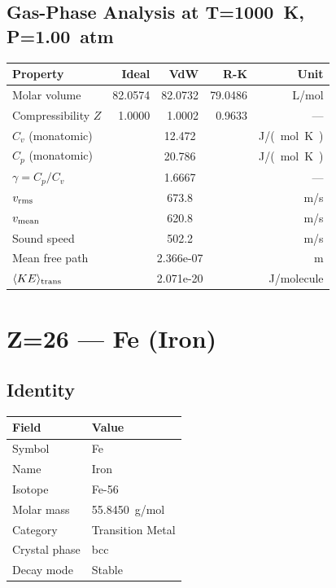 \documentclass[11pt,a4paper]{article}
\begin{document}
\subsection{Gas-Phase Analysis at T=\SI{1000}{K}, P=\SI{1.00}{atm}}
\begin{tabular}{lrrrr}
  \toprule
  Property & Ideal & VdW & R-K & Unit \\
  \midrule
  Molar volume & 82.0574 & 82.0732 & 79.0486 & \si{L/mol} \\
  Compressibility $Z$ & 1.0000 & 1.0002 & 0.9633 & --- \\
  \midrule
  $C_v$ (monatomic) & \multicolumn{3}{c}{12.472} & \si{J/(mol.K)} \\
  $C_p$ (monatomic) & \multicolumn{3}{c}{20.786} & \si{J/(mol.K)} \\
  $\gamma = C_p/C_v$ & \multicolumn{3}{c}{1.6667} & --- \\
  $v_{\rm rms}$ & \multicolumn{3}{c}{673.8} & \si{m/s} \\
  $v_{\rm mean}$ & \multicolumn{3}{c}{620.8} & \si{m/s} \\
  Sound speed & \multicolumn{3}{c}{502.2} & \si{m/s} \\
  Mean free path & \multicolumn{3}{c}{2.366e-07} & \si{m} \\
  $\langle KE \rangle_{\rm trans}$ & \multicolumn{3}{c}{2.071e-20} & \si{J/molecule} \\
  \bottomrule
\end{tabular}

\newpage

\section{Z=26 --- Fe (Iron)}
\label{sec:Z26}

\subsection{Identity}
\begin{tabular}{ll}
  \toprule
  Field & Value \\
  \midrule
  Symbol & Fe \\
  Name & Iron \\
  Isotope & Fe-56 \\
  Molar mass & \SI{55.8450}{g/mol} \\
  Category & Transition Metal \\
  Crystal phase & bcc \\
  Decay mode & Stable \\
  \bottomrule
\end{tabular}
\end{document}
